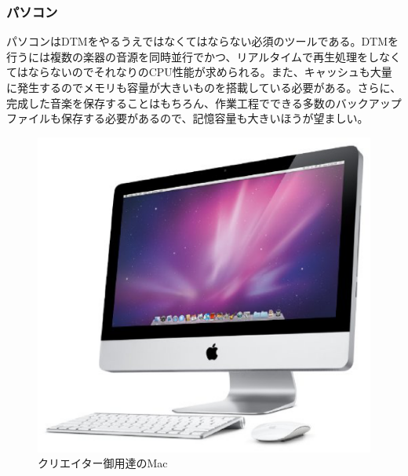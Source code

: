 \documentclass[ams]{U-AizuGT}
\begin{document}
\subsubsection{パソコン}
パソコンはDTMをやるうえではなくてはならない必須のツールである。DTMを行うには複数の楽器の音源を同時並行でかつ、リアルタイムで再生処理をしなくてはならないのでそれなりのCPU性能が求められる。また、キャッシュも大量に発生するのでメモリも容量が大きいものを搭載している必要がある。さらに、完成した音楽を保存することはもちろん、作業工程でできる多数のバックアップファイルも保存する必要があるので、記憶容量も大きいほうが望ましい。
\begin{figure}[htbp]
  \begin{center}
    \includegraphics[scale=0.2]{./mac.eps}
    \caption{クリエイター御用達のMac}
    \label{fig:mac}
  \end{center}
\end{figure}
\\
\end{document}
